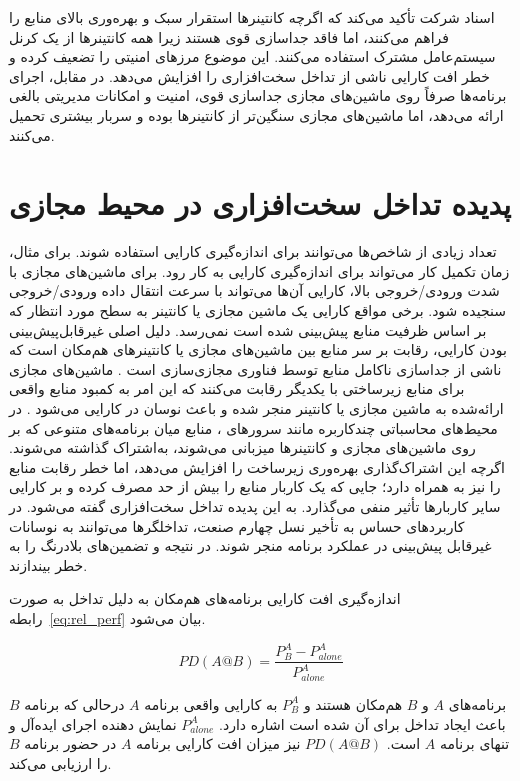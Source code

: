 اسناد شرکت  تأکید می‌کند\cite{vmware_whitepaper} که اگرچه کانتینرها استقرار سبک و بهره‌وری بالای منابع را فراهم می‌کنند، اما فاقد جداسازی قوی هستند زیرا همه کانتینرها از یک کرنل سیستم‌عامل مشترک استفاده می‌کنند. این موضوع مرزهای امنیتی را تضعیف کرده و خطر افت کارایی ناشی از تداخل سخت‌افزاری را افزایش می‌دهد. در مقابل، اجرای برنامه‌ها صرفاً روی ماشین‌های مجازی جداسازی قوی، امنیت و امکانات مدیریتی بالغی ارائه می‌دهد، اما ماشین‌های مجازی سنگین‌تر از کانتینرها بوده و سربار بیشتری تحمیل می‌کنند.

\section{پدیده تداخل سخت‌افزاری در محیط مجازی}

تعداد زیادی از شاخص‌ها می‌توانند برای اندازه‌گیری کارایی استفاده شوند. برای مثال، زمان تکمیل کار می‌تواند برای اندازه‌گیری کارایی به کار رود. برای ماشین‌های مجازی با شدت ورودی/خروجی بالا، کارایی آن‌ها می‌تواند با سرعت انتقال داده ورودی/خروجی سنجیده شود. برخی مواقع کارایی یک ماشین مجازی یا کانتینر به سطح مورد انتظار که بر اساس ظرفیت منابع پیش‌بینی شده است نمی‌رسد. دلیل اصلی غیرقابل‌پیش‌بینی بودن کارایی، رقابت بر سر منابع بین ماشین‌های مجازی یا کانتینرهای هم‌مکان است که ناشی از جداسازی ناکامل منابع توسط فناوری مجازی‌سازی است \cite{armbrust2009clouds}. ماشین‌های مجازی برای منابع زیرساختی با یکدیگر رقابت می‌کنند که این امر به کمبود منابع واقعی ارائه‌شده به ماشین مجازی یا کانتینر منجر شده و باعث نوسان در کارایی می‌شود \cite{koh2007interference}. در محیط‌های محاسباتی چندکاربره مانند سرورهای ، منابع میان برنامه‌های متنوعی که بر روی ماشین‌های مجازی و کانتینرها میزبانی می‌شوند، به‌اشتراک گذاشته می‌شوند. اگرچه این اشتراک‌گذاری بهره‌وری زیرساخت را افزایش می‌دهد، اما خطر رقابت منابع را نیز به همراه دارد؛ جایی که یک کاربار منابع را بیش از حد مصرف کرده و بر کارایی سایر کاربارها تأثیر منفی می‌گذارد. به این پدیده تداخل سخت‌افزاری گفته می‌شود. در کاربردهای حساس به تأخیر نسل چهارم صنعت، تداخلگرها می‌توانند به نوسانات غیرقابل پیش‌بینی در عملکرد برنامه منجر شوند. در نتیجه  و تضمین‌های بلادرنگ را به خطر بیندازند.

اندازه‌گیری افت کارایی برنامه‌های هم‌مکان به دلیل تداخل به صورت رابطه~\eqref{eq:rel_perf} بیان می‌شود\cite{lin2023vminterference}.

\begin{equation} \label{eq:rel_perf}
    PD(A@B) = \frac{P^A_B - P^A_{alone}}{P^A_{alone}}
\end{equation}

برنامه‌های $A$ و $B$ هم‌مکان هستند و $P^A_B$ به کارایی واقعی برنامه $A$ درحالی که برنامه $B$ باعث ایجاد تداخل برای آن شده است اشاره دارد. $P^A_{alone}$ نمایش دهنده اجرای ایده‌آل و تنهای برنامه $A$ است. $PD(A@B)$ نیز میزان افت کارایی برنامه $A$ در حضور برنامه $B$ را ارزیابی می‌کند.

